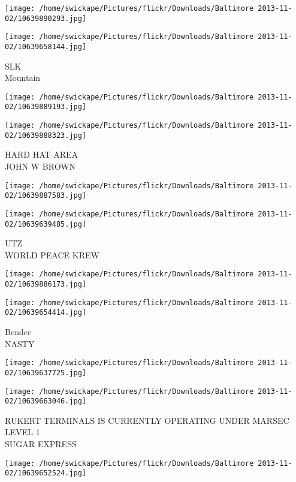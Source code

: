 \documentclass[10pt,letterpaper]{article}
\begin{document}
\texttt{[image: /home/swickape/Pictures/flickr/Downloads/Baltimore 2013-11-02/10639890293.jpg]}

\vspace{0.25in}
\texttt{[image: /home/swickape/Pictures/flickr/Downloads/Baltimore 2013-11-02/10639658144.jpg]}

SLK\\
Mountain
\pagebreak

\texttt{[image: /home/swickape/Pictures/flickr/Downloads/Baltimore 2013-11-02/10639889193.jpg]}

\vspace{0.25in}
\texttt{[image: /home/swickape/Pictures/flickr/Downloads/Baltimore 2013-11-02/10639888323.jpg]}

HARD HAT AREA\\
JOHN W BROWN
\pagebreak

\texttt{[image: /home/swickape/Pictures/flickr/Downloads/Baltimore 2013-11-02/10639887583.jpg]}

\vspace{0.25in}
\texttt{[image: /home/swickape/Pictures/flickr/Downloads/Baltimore 2013-11-02/10639639485.jpg]}

UTZ\\
WORLD PEACE KREW
\pagebreak

\texttt{[image: /home/swickape/Pictures/flickr/Downloads/Baltimore 2013-11-02/10639886173.jpg]}

\vspace{0.25in}
\texttt{[image: /home/swickape/Pictures/flickr/Downloads/Baltimore 2013-11-02/10639654414.jpg]}

Bender\\
NASTY
\pagebreak

\texttt{[image: /home/swickape/Pictures/flickr/Downloads/Baltimore 2013-11-02/10639637725.jpg]}

\vspace{0.25in}
\texttt{[image: /home/swickape/Pictures/flickr/Downloads/Baltimore 2013-11-02/10639663046.jpg]}

RUKERT TERMINALS IS CURRENTLY OPERATING UNDER MARSEC LEVEL 1\\
SUGAR EXPRESS
\pagebreak

\texttt{[image: /home/swickape/Pictures/flickr/Downloads/Baltimore 2013-11-02/10639652524.jpg]}
\end{document}
